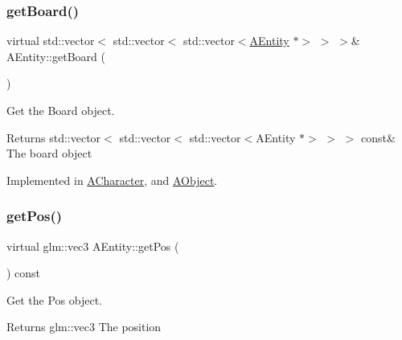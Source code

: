 \mbox{\label{class_a_entity_a44aa82958386de50cd9a6c836461114a}} 
\subsubsection{\texorpdfstring{get\+Board()}{getBoard()}\hspace{0.1cm}{\footnotesize\ttfamily [2/2]}}
{\footnotesize\ttfamily virtual std\+::vector$<$ std\+::vector$<$ std\+::vector$<$\hyperlink{class_a_entity}{A\+Entity} $\ast$$>$ $>$ $>$\& A\+Entity\+::get\+Board (\begin{DoxyParamCaption}{ }\end{DoxyParamCaption})\hspace{0.3cm}{\ttfamily [pure virtual]}}



Get the Board object. 

\begin{DoxyReturn}{Returns}
std\+::vector$<$ std\+::vector$<$ std\+::vector$<$\+A\+Entity $\ast$$>$ $>$ $>$ const\& The board object 
\end{DoxyReturn}


Implemented in \hyperlink{class_a_character_aa8f0b9b557c69eead696870c41c8321b}{A\+Character}, and \hyperlink{class_a_object_aba4b07c0456b2c3d42a71529ef40f2d5}{A\+Object}.

\mbox{\label{class_a_entity_afbdb591f06debd7e20e0cb98f14717e4}} 
\subsubsection{\texorpdfstring{get\+Pos()}{getPos()}}
{\footnotesize\ttfamily virtual glm\+::vec3 A\+Entity\+::get\+Pos (\begin{DoxyParamCaption}{ }\end{DoxyParamCaption}) const\hspace{0.3cm}{\ttfamily [pure virtual]}}



Get the Pos object. 

\begin{DoxyReturn}{Returns}
glm\+::vec3 The position 
\end{DoxyReturn}


